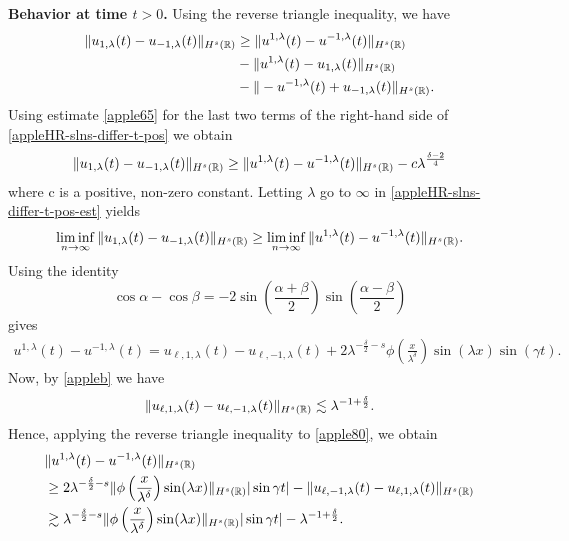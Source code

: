 \textbf{Behavior at time  $t>0$.}  Using the reverse triangle inequality, we 
have
%
%
%
%
%
\begin{equation} \label{appleHR-slns-differ-t-pos}
\begin{split}
\|
u_{1,\lambda}(t)
-
u_{- 1,\lambda}(t)
\|_{H^s(\mathbb{R})}
&
\ge
\|
u^{1,\lambda}(t)
-
u^{- 1,\lambda}(t)
\|_{H^s(\mathbb{R})}
\\
& -
\|
u^{1,\lambda}(t)
-
u_{1,\lambda}(t)
\|_{H^s(\mathbb{R})}
\\
& -
\|
-u^{-1,\lambda}(t)
+
u_{-1,\lambda}(t)
\|_{H^s(\mathbb{R})}.
\end{split}
\end{equation}
%
%
%
%
Using estimate \eqref{apple65} for the last two terms of 
the right-hand side of \eqref{appleHR-slns-differ-t-pos} we obtain
%
%
%
%
%
\begin{equation} \label{appleHR-slns-differ-t-pos-est}
\|
u_{1,\lambda}(t)
-
u_{- 1,\lambda}(t)
\|_{H^s(\mathbb{R})}
\ge
\|
u^{1,\lambda}(t)
-
u^{- 1,\lambda}(t)
\|_{H^s(\mathbb{R})}
-
c \lambda^{\frac{\delta - 2}{4}}
\end{equation}
%
%
where c is a positive, non-zero constant. Letting $\lambda$ go to $\infty$ 
in
\eqref{appleHR-slns-differ-t-pos-est}
yields
%
%
%
\begin{equation} \label{appleHR-slns-to-ap-est}
\liminf_{n\to\infty}
\|
u_{1,\lambda}(t)
-
u_{- 1,\lambda}(t)
\|_{H^s(\mathbb{R})}
\ge
\liminf_{n\to\infty}
\|
u^{1,\lambda}(t)
-
u^{- 1,\lambda}(t)
\|_{H^s(\mathbb{R})}.
\end{equation}
%
%
%
%
Using the identity $$
\cos \alpha -\cos \beta
=
-2
\sin(\frac{\alpha + \beta}{2})
\sin(\frac{\alpha - \beta}{2})
$$
gives
%
%
\begin{equation}
\label{apple80}
\begin{split}
u^{1,\lambda}(t)
-
u^{- 1,\lambda}(t)
=
u_{\ell,1,\lambda}(t) - u_{\ell,-1,\lambda}(t) + 
2\lambda^{-\frac{\delta}{2}-s}
\phi\left( \frac{x}{\lambda^\delta} \right)\sin(\lambda x) \sin(\gamma t).
\end{split}
\end{equation}
%
%
Now, by  \cref{appleb} we have
%
%
\begin{equation*}
\begin{split}
\|u_{\ell,1,\lambda}(t) - u_{\ell,-1,\lambda}(t)\|_{H^s(\mathbb{R})} \lesssim
\lambda^{-1 + \frac{\delta}{2}}.
\end{split}
\end{equation*}
%
%
Hence, applying the reverse triangle inequality to \eqref{apple80}, we 
obtain
%
%
\begin{equation} \label{apple90}
\begin{split}
& \|
u^{1,\lambda}(t)
-
u^{- 1,\lambda}(t)
\|_{H^s(\mathbb{R})}
\\
& \ge 2 \lambda^{-\frac{\delta}{2}-s} \|\phi\left(
\frac{x}{\lambda^\delta} \right) \sin(\lambda x) \|_{H^s(\mathbb{R})} |\sin \gamma 
t|
- \|u_{\ell,-1,\lambda}(t) - u_{\ell,1,\lambda}(t)\|_{H^s(\mathbb{R})} \\
& \gtrsim \lambda^{-\frac{\delta}{2}-s} \|\phi\left(
\frac{x}{\lambda^\delta} \right ) \sin(\lambda x) \|_{H^s(\mathbb{R})} |\sin 
\gamma t| -
\lambda^{-1 + \frac{\delta}{2}}.
\end{split}
\end{equation}
